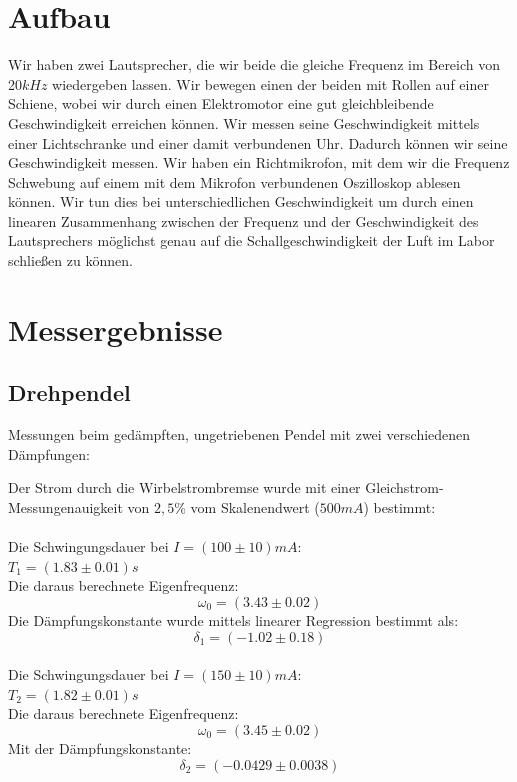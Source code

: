 \documentclass{article}
\begin{document}
\section{Aufbau}
Wir haben zwei Lautsprecher, die wir beide die gleiche Frequenz im Bereich von 20$\si{kHz}$ wiedergeben lassen. Wir bewegen einen der beiden mit Rollen auf einer Schiene, wobei wir durch einen Elektromotor eine gut gleichbleibende Geschwindigkeit erreichen können. Wir messen seine Geschwindigkeit mittels einer Lichtschranke und einer damit verbundenen Uhr. Dadurch können wir seine Geschwindigkeit messen. Wir haben ein Richtmikrofon, mit dem wir die Frequenz Schwebung auf einem mit dem Mikrofon verbundenen Oszilloskop ablesen können. Wir tun dies bei unterschiedlichen Geschwindigkeit um durch einen linearen Zusammenhang zwischen der Frequenz und der Geschwindigkeit des Lautsprechers möglichst genau auf die Schallgeschwindigkeit der Luft im Labor schließen zu können.
\section{Messergebnisse}

\subsection{Drehpendel}
Messungen beim gedämpften, ungetriebenen Pendel mit zwei verschiedenen Dämpfungen:

Der Strom durch die Wirbelstrombremse wurde mit einer Gleichstrom-Messungenauigkeit von $2,5\%$ vom Skalenendwert ($500mA$) bestimmt:\\
\\
Die Schwingungsdauer bei $I=(100\pm 10) \si{mA}$:\\
$T_1=(1.83 \pm 0.01)\si{s}$\\
Die daraus berechnete Eigenfrequenz:
$$\omega_0=(3.43 \pm 0.02)$$
Die Dämpfungskonstante wurde mittels linearer Regression bestimmt als:
$$\delta_1=(-1.02 \pm 0.18)$$
\\
Die Schwingungsdauer bei $I=(150\pm 10) \si{mA}$:\\
$T_2=(1.82 \pm 0.01)\si{s}$\\
Die daraus berechnete Eigenfrequenz:
$$\omega_0=(3.45 \pm 0.02)$$
Mit der Dämpfungskonstante:
$$\delta_2=(-0.0429 \pm 0.0038)$$


\end{document}
